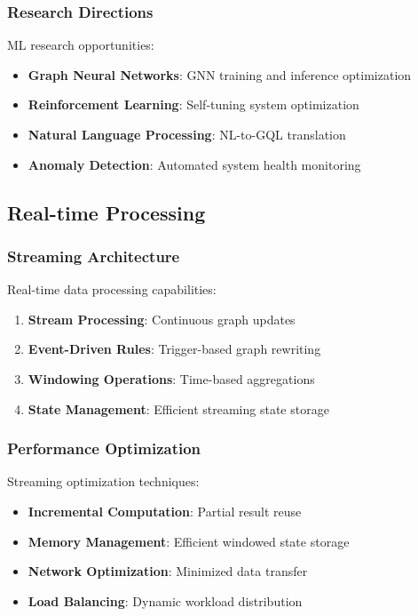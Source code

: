 \documentclass[11pt,a4paper]{article}
\begin{document}
\subsubsection{Research Directions}
\label{subsubsec:ml_research}

ML research opportunities:

\begin{itemize}
\item \textbf{Graph Neural Networks}: GNN training and inference optimization
\item \textbf{Reinforcement Learning}: Self-tuning system optimization
\item \textbf{Natural Language Processing}: NL-to-GQL translation
\item \textbf{Anomaly Detection}: Automated system health monitoring
\end{itemize}

\subsection{Real-time Processing}
\label{subsec:real_time}

\subsubsection{Streaming Architecture}
\label{subsubsec:streaming_architecture}

Real-time data processing capabilities:

\begin{enumerate}
\item \textbf{Stream Processing}: Continuous graph updates
\item \textbf{Event-Driven Rules}: Trigger-based graph rewriting
\item \textbf{Windowing Operations}: Time-based aggregations
\item \textbf{State Management}: Efficient streaming state storage
\end{enumerate}

\subsubsection{Performance Optimization}
\label{subsubsec:streaming_performance}

Streaming optimization techniques:

\begin{itemize}
\item \textbf{Incremental Computation}: Partial result reuse
\item \textbf{Memory Management}: Efficient windowed state storage
\item \textbf{Network Optimization}: Minimized data transfer
\item \textbf{Load Balancing}: Dynamic workload distribution
\end{itemize}
\end{document}
